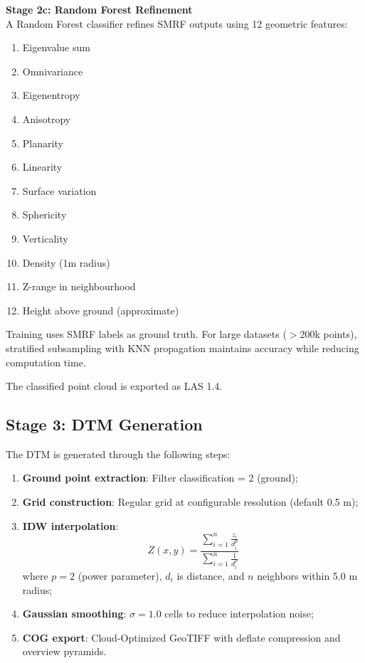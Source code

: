 \documentclass[a4paper,12pt]{article}
\begin{document}
\textbf{Stage 2c: Random Forest Refinement}\\
A Random Forest classifier refines SMRF outputs using 12 geometric features:

\begin{enumerate}
	\item Eigenvalue sum
	\item Omnivariance
	\item Eigenentropy
	\item Anisotropy
	\item Planarity
	\item Linearity
	\item Surface variation
	\item Sphericity
	\item Verticality
	\item Density (1m radius)
	\item Z-range in neighbourhood
	\item Height above ground (approximate)
\end{enumerate}

Training uses SMRF labels as ground truth. For large datasets ($>$200k points), stratified subsampling with KNN propagation maintains accuracy while reducing computation time.

The classified point cloud is exported as LAS 1.4.

\subsection{Stage 3: DTM Generation}

The DTM is generated through the following steps:

\begin{enumerate}
	\item \textbf{Ground point extraction}: Filter classification = 2 (ground);
	\item \textbf{Grid construction}: Regular grid at configurable resolution (default 0.5 m);
	\item \textbf{IDW interpolation}:
	      \begin{equation}
		      Z(x,y) = \frac{\sum_{i=1}^{n} \frac{z_i}{d_i^p}}{\sum_{i=1}^{n} \frac{1}{d_i^p}}
	      \end{equation}
	      where $p=2$ (power parameter), $d_i$ is distance, and $n$ neighbors within 5.0 m radius;
	\item \textbf{Gaussian smoothing}: $\sigma=1.0$ cells to reduce interpolation noise;
	\item \textbf{COG export}: Cloud-Optimized GeoTIFF with deflate compression and overview pyramids.
\end{enumerate}
\end{document}
